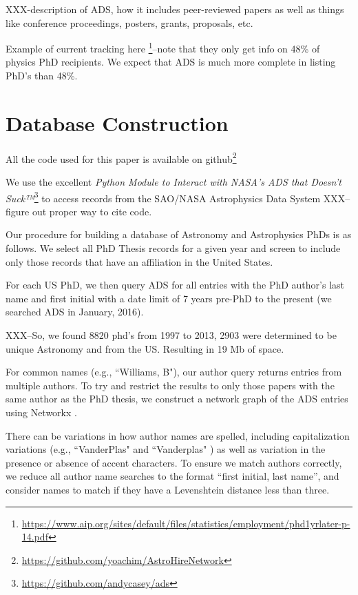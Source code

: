 \documentclass[preprint2]{aastex}
\begin{document}
XXX-description of ADS, how it includes peer-reviewed papers as well as things like conference proceedings, posters, grants, proposals, etc.

Example of current tracking here \footnote{\url{https://www.aip.org/sites/default/files/statistics/employment/phd1yrlater-p-14.pdf}}--note that they only get info on 48\% of physics PhD recipients.  We expect that ADS is much more complete in listing PhD's than 48\%.



\section{Database Construction}\label{sec:db_construct}

All the code used for this paper is available on github\footnote{\url{https://github.com/yoachim/AstroHireNetwork}}

We use the excellent {\emph{Python Module to Interact with NASA's ADS that Doesn't Suck™}}\footnote{\url{https://github.com/andycasey/ads}} to access records from the SAO/NASA Astrophysics Data System XXX--figure out proper way to cite code. 

Our procedure for building a database of Astronomy and Astrophysics PhDs is as follows.  We select all PhD Thesis records for a given year and screen to include only those records that have an affiliation in the United States.

For each US PhD, we then query ADS for all entries with the PhD author's last name and first initial with a date limit of 7 years pre-PhD to the present (we searched ADS in January, 2016).

XXX--So, we found 8820 phd's from 1997 to 2013, 2903 were determined to be unique Astronomy and from the US. Resulting in 19 Mb of space.  

For common names (e.g.,  ``Williams, B"), our author query returns entries from multiple authors.  To try and restrict the results to only those papers with the same author as the PhD thesis, we construct a network graph of the ADS entries using Networkx \citet{networkx}.

There can be variations in how author names are spelled, including capitalization variations (e.g., ``VanderPlas" \citep{VanderPlas12} and ``Vanderplas" \citep{van12}) as well as variation in the presence or absence of accent characters.  To ensure we match authors correctly, we reduce all author name searches to the format ``first initial, last name'', and consider names to match if they have a Levenshtein distance less than three.
\end{document}
